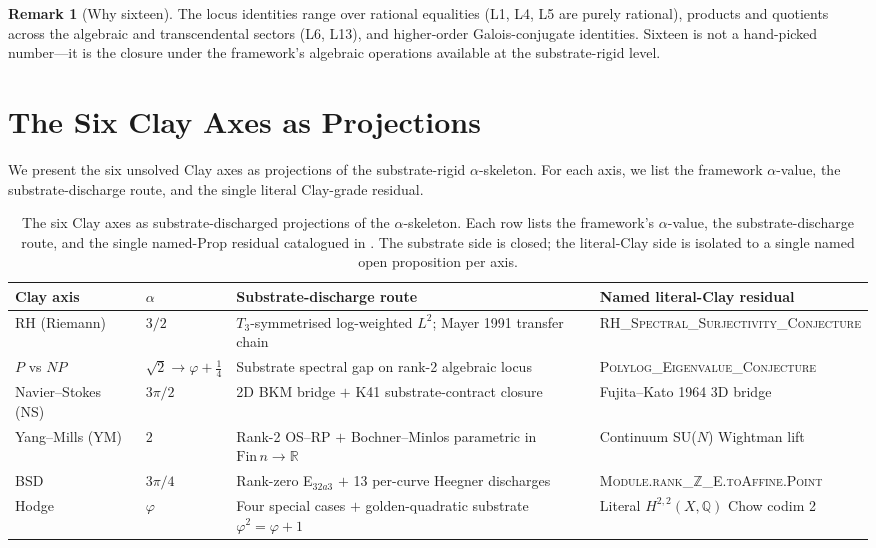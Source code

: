 \documentclass[11pt,a4paper]{amsart}
\theoremstyle{plain}
\theoremstyle{definition}
\newtheorem{remark}[theorem]{Remark}
\newcommand{\Rl}{\mathbb{R}}
\newcommand{\Zn}{\mathbb{Z}}
\newcommand{\Qr}{\mathbb{Q}}
\newcommand{\golden}{\varphi}
\begin{document}
\begin{remark}[Why sixteen]
The locus identities range over rational equalities (L1, L4, L5 are
purely rational), products and quotients across the algebraic and
transcendental sectors (L6, L13), and higher-order Galois-conjugate
identities. Sixteen is not a hand-picked number---it is the closure
under the framework's algebraic operations available at the
substrate-rigid level.
\end{remark}

\section{The Six Clay Axes as Projections}
\label{sec:six}

We present the six unsolved Clay axes as projections of the
substrate-rigid $\alpha$-skeleton. For each axis, we list the framework
$\alpha$-value, the substrate-discharge route, and the single literal
Clay-grade residual.

\begin{table}[h]
\centering
\small
\begin{tabular}{p{2.4cm}p{1.5cm}p{4.4cm}p{4.0cm}}
\toprule
Clay axis & $\alpha$ & Substrate-discharge route & Named literal-Clay residual \\
\midrule
RH (Riemann)             & $3/2$       & $T_{3}$-symmetrised log-weighted $L^{2}$; Mayer 1991 transfer chain                    & \textsc{RH\_Spectral\_Surjectivity\_Conjecture} \\
$P$ vs $NP$              & $\sqrt{2}{\to}\golden{+}\tfrac14$ & Substrate spectral gap on rank-2 algebraic locus                            & \textsc{Polylog\_Eigenvalue\_Conjecture} \\
Navier--Stokes (NS)      & $3\pi/2$    & 2D BKM bridge $+$ K41 substrate-contract closure                                       & Fujita--Kato 1964 3D bridge \\
Yang--Mills (YM)         & $2$         & Rank-2 OS--RP $+$ Bochner--Minlos parametric in $\text{Fin}\,n \to \Rl$           & Continuum SU($N$) Wightman lift \\
BSD                      & $3\pi/4$    & Rank-zero E$_{32a3}$ $+$ 13 per-curve Heegner discharges                                & \textsc{Module.rank\_$\Zn$\_E.toAffine.Point} \\
Hodge                    & $\golden$   & Four special cases $+$ golden-quadratic substrate $\golden^{2}=\golden+1$         & Literal $H^{2,2}(X,\Qr)$ Chow codim 2 \\
\bottomrule
\end{tabular}
\caption{The six Clay axes as substrate-discharged projections of the
$\alpha$-skeleton. Each row lists the framework's $\alpha$-value, the
substrate-discharge route, and the single named-Prop residual catalogued
in \cite{principiaFractalisRepo}. The substrate side is closed; the
literal-Clay side is isolated to a single named open proposition per
axis.}
\label{tab:sixclay}
\end{table}
\end{document}
